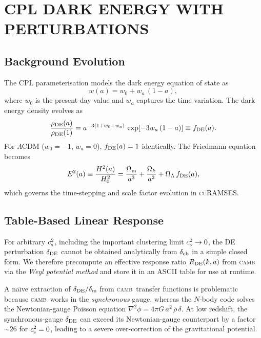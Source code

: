 \documentclass[fleqn,usenatbib]{mnras}
\newcommand{\curamses}{\textsc{cuRAMSES}}
\newcommand{\camb}{\textsc{camb}}
\newcommand{\Om}{\Omega_{\rm m}}
\newcommand{\Ol}{\Omega_\Lambda}
\newcommand{\Rde}{R_{\rm DE}}
\newcommand{\cst}{c_{\rm s}^2}
\begin{document}
\section{CPL DARK ENERGY WITH PERTURBATIONS}
\label{sec:de}

\subsection{Background Evolution}
\label{sec:de_background}

The CPL parameterisation \citep{Chevallier2001,Linder2003} models the
dark energy equation of state as
\begin{equation}
w(a) = w_0 + w_a\,(1 - a),
\label{eq:cpl}
\end{equation}
where $w_0$ is the present-day value and $w_a$ captures the
time variation.  The dark energy density evolves as
\begin{equation}
\frac{\rho_{\rm DE}(a)}{\rho_{\rm DE}(1)}
  = a^{-3(1+w_0+w_a)}\,\exp\!\left[-3w_a\,(1-a)\right]
  \equiv f_{\rm DE}(a).
\label{eq:fde}
\end{equation}
For $\Lambda$CDM ($w_0=-1$, $w_a=0$), $f_{\rm DE}(a) = 1$ identically.
The Friedmann equation becomes
\begin{equation}
E^2(a) \equiv \frac{H^2(a)}{H_0^2}
  = \frac{\Om}{a^3} + \frac{\Omega_k}{a^2} + \Ol\,f_{\rm DE}(a),
\label{eq:friedmann}
\end{equation}
which governs the time-stepping and scale factor evolution in
\curamses.

\subsection{Table-Based Linear Response}
\label{sec:de_table}

For arbitrary $\cst$, including the important clustering limit
$\cst \to 0$, the DE perturbation $\delta_{\rm DE}$ cannot be
obtained analytically from $\delta_{\rm cb}$ in a simple closed form.
We therefore precompute an effective response ratio $\Rde(k,a)$ from
\camb\ \citep{Lewis2000} via the \emph{Weyl potential method} and
store it in an ASCII table for use at runtime.

A na\"{\i}ve extraction of $\delta_{\rm DE}/\delta_{\rm m}$ from
\camb\ transfer functions is problematic because \camb\ works in the
\emph{synchronous} gauge, whereas the $N$-body code solves the
Newtonian-gauge Poisson equation $\nabla^2\phi = 4\pi G\,a^2\,
\bar\rho\,\delta$.  At low redshift, the synchronous-gauge
$\delta_{\rm DE}$ can exceed its Newtonian-gauge counterpart by a
factor ${\sim}26$ for $\cst = 0$, leading to a severe
over-correction of the gravitational potential.
\end{document}
